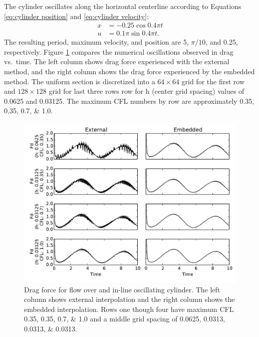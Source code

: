 The cylinder oscillates along the horizontal centerline according to Equations \eqref{eq:cylinder position} and \eqref{eq:cylinder velocity}:
\begin{align}
x&=-0.25\cos{0.4\pi t}\label{eq:cylinder position}\\
u&=0.1\pi\sin{0.4\pi t}.\;\label{eq:cylinder velocity}
\end{align}
The resulting period, maximum velocity, and position are 5, $\pi/10$, and 0.25, respectively. 
Figure \ref{fig:osccylinder} compares the numerical oscillations observed in drag vs.~time. 
The left column shows drag force experienced with the external method, and the right column shows the drag force experienced by the embedded method.
The uniform section is discretized into a $64 \times 64$ grid for the first row and $ 128 \times 128$ grid for last three rows row for h (center grid spacing) values of 0.0625 and 0.03125. 
The maximum CFL numbers by row are approximately \numlist{0.35; 0.35; 0.7; 1.0}.
\begin{figure}[!htb]
	\centering
	\par\medskip
	\includegraphics[width=\textwidth]{osc_cylinder}
	\caption{Drag force for flow over and in-line oscillating cylinder. The left column shows external interpolation and the right column shows the embedded interpolation. Rows one though four have maximum CFL \numlist{0.35; 0.35; 0.7; 1.0} and a middle grid spacing of \numlist{0.0625; 0.0313; 0.0313; 0.0313}.}
	\label{fig:osccylinder}
\end{figure}

